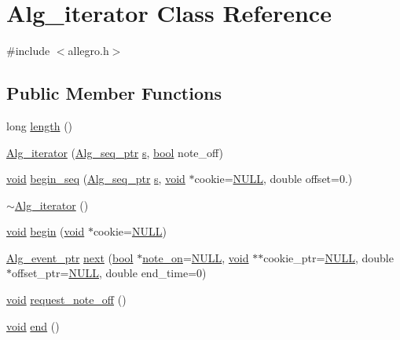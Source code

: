 \hypertarget{class_alg__iterator}{}\section{Alg\+\_\+iterator Class Reference}
\label{class_alg__iterator}


{\ttfamily \#include $<$allegro.\+h$>$}

\subsection*{Public Member Functions}
\begin{DoxyCompactItemize}
\item 
long \hyperlink{class_alg__iterator_a5e8c3cc1cbadea9894bf422968a4e1a7}{length} ()
\item 
\hyperlink{class_alg__iterator_a92d6ea7a0bb34a53987049c7e3bcff9d}{Alg\+\_\+iterator} (\hyperlink{allegro_8h_aad5a663237745add3ab7fec40d5f2c87}{Alg\+\_\+seq\+\_\+ptr} \hyperlink{lib_2expat_8h_a755339d27872b13735c2cab829e47157}{s}, \hyperlink{mac_2config_2i386_2lib-src_2libsoxr_2soxr-config_8h_abb452686968e48b67397da5f97445f5b}{bool} note\+\_\+off)
\item 
\hyperlink{sound_8c_ae35f5844602719cf66324f4de2a658b3}{void} \hyperlink{class_alg__iterator_afa060e64a0c04586b59c2bd8a502290e}{begin\+\_\+seq} (\hyperlink{allegro_8h_aad5a663237745add3ab7fec40d5f2c87}{Alg\+\_\+seq\+\_\+ptr} \hyperlink{lib_2expat_8h_a755339d27872b13735c2cab829e47157}{s}, \hyperlink{sound_8c_ae35f5844602719cf66324f4de2a658b3}{void} $\ast$cookie=\hyperlink{px__mixer_8h_a070d2ce7b6bb7e5c05602aa8c308d0c4}{N\+U\+LL}, double offset=0.)
\item 
\hyperlink{class_alg__iterator_ab3ad502c274cbaae24c2435f6dbf5914}{$\sim$\+Alg\+\_\+iterator} ()
\item 
\hyperlink{sound_8c_ae35f5844602719cf66324f4de2a658b3}{void} \hyperlink{class_alg__iterator_a59c05da591cc008ff1be195335646046}{begin} (\hyperlink{sound_8c_ae35f5844602719cf66324f4de2a658b3}{void} $\ast$cookie=\hyperlink{px__mixer_8h_a070d2ce7b6bb7e5c05602aa8c308d0c4}{N\+U\+LL})
\item 
\hyperlink{allegro_8h_aeb8db009b4ffadef2e7ca0e4936f0307}{Alg\+\_\+event\+\_\+ptr} \hyperlink{class_alg__iterator_af175a74563cdefc967e4b568763fa818}{next} (\hyperlink{mac_2config_2i386_2lib-src_2libsoxr_2soxr-config_8h_abb452686968e48b67397da5f97445f5b}{bool} $\ast$\hyperlink{latency_8c_a3960aab9a5bdee464614429f8ccb6a80}{note\+\_\+on}=\hyperlink{px__mixer_8h_a070d2ce7b6bb7e5c05602aa8c308d0c4}{N\+U\+LL}, \hyperlink{sound_8c_ae35f5844602719cf66324f4de2a658b3}{void} $\ast$$\ast$cookie\+\_\+ptr=\hyperlink{px__mixer_8h_a070d2ce7b6bb7e5c05602aa8c308d0c4}{N\+U\+LL}, double $\ast$offset\+\_\+ptr=\hyperlink{px__mixer_8h_a070d2ce7b6bb7e5c05602aa8c308d0c4}{N\+U\+LL}, double end\+\_\+time=0)
\item 
\hyperlink{sound_8c_ae35f5844602719cf66324f4de2a658b3}{void} \hyperlink{class_alg__iterator_acb5ab98cfb31581b3501a9cdc6d86868}{request\+\_\+note\+\_\+off} ()
\item 
\hyperlink{sound_8c_ae35f5844602719cf66324f4de2a658b3}{void} \hyperlink{class_alg__iterator_a92b44e65fa07d97f7f41494b06201543}{end} ()
\end{DoxyCompactItemize}
